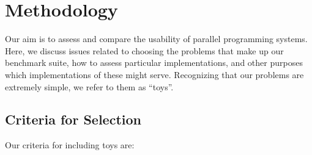 \section{Methodology\label{s:method}}

Our aim is to assess and compare the usability of parallel programming systems.
Here,
we discuss issues related to choosing the problems that make up our benchmark suite,
how to assess particular implementations,
and other purposes which implementations of these might serve.
Recognizing that our problems are extremely simple,
we refer to them as ``toys''.

\subsection{Criteria for Selection\label{s:method-criteria}}

Our criteria for including toys are:


